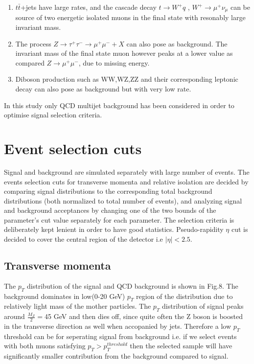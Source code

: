 \documentclass[12pt,a4paper]{article}		%
\begin{document}
\begin{enumerate}
								\item $t \bar{t}$+jets have large rates, and the cascade decay $t \to W^+q$ , $W^+ \to \mu^+ \nu_{\mu}$  can be source of two energetic isolated muons in the final state with resonably large invariant mass.
								
								\item The process $Z \to \tau^+\tau^- \to \mu^+\mu^- + X$ can also pose as background. The invariant mass of the final state muon however peaks at a lower value as compared $Z \to \mu^+\mu^-$, due to missing energy.     
								 
								\item Diboson production such as WW,WZ,ZZ and their corresponding leptonic decay can also pose as background but with very low rate.
								   
							\end{enumerate}
							In this study only QCD multijet background has been considered in order to optimise signal selection criteria.		    
									    
 \newpage
\section{Event selection cuts}


Signal and background are simulated separately with large number of events. The events selection cuts for transverse momenta and relative isolation are decided by comparing signal distributions to the corresponding total background distributions (both normalized to total number of events), and analyzing signal and background acceptances by changing one of the two bounds of the parameter's cut value separately for each parameter. The selection criteria is deliberately kept lenient in order to have good statistics. Pseudo-rapidity $\eta$ cut is decided to cover the central region of the detector i.e $|\eta|< 2.5$.  
  
\subsection{Transverse momenta}   
The $p_T$ distribution of the signal and QCD background is shown in Fig.8. The background dominates in low(0-20 GeV) $p_T$ region of the distribution due to relatively light mass of the mother particles. The $p_T$ distribution of signal peaks around $\frac{M_Z}{2} = $45 GeV and then dies off, since quite often the Z boson is boosted in the transverse direction as well when accopanied by jets. Therefore a low $p_T$ threshold can be for seperating signal from background i.e. if we select events with both muons satisfying $p_T > p_T^{threshold}$ then the selected sample will have significantly smaller contribution from the background compared to signal. 
\end{document}
